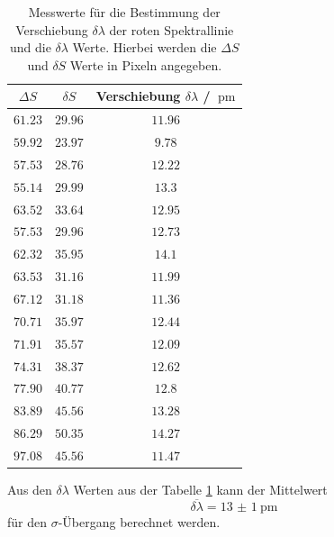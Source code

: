 \begin{table}
    \centering
    \caption{Messwerte für die Bestimmung der Verschiebung $\delta \lambda$ der roten Spektrallinie und die $\delta\lambda$ Werte. Hierbei werden die $\Delta S$ und $\delta S$ Werte in Pixeln angegeben.}
    \label{tab:rot_Verschiebung}
    \begin{tabular}{c c c}
        \toprule
        $\Delta S$&$\delta S$&Verschiebung $\delta \lambda$ / $\SI{}{\pico\meter}$\\
        \midrule 
        $\num{61.23}$&$\num{29.96}$&$\num{11.96}$\\
        $\num{59.92}$&$\num{23.97}$&$\num{9.78}$\\
        $\num{57.53}$&$\num{28.76}$&$\num{12.22}$\\
        $\num{55.14}$&$\num{29.99}$&$\num{13.3}$\\
        $\num{63.52}$&$\num{33.64}$&$\num{12.95}$\\
        $\num{57.53}$&$\num{29.96}$&$\num{12.73}$\\
        $\num{62.32}$&$\num{35.95}$&$\num{14.1}$\\
        $\num{63.53}$&$\num{31.16}$&$\num{11.99}$\\
        $\num{67.12}$&$\num{31.18}$&$\num{11.36}$\\
        $\num{70.71}$&$\num{35.97}$&$\num{12.44}$\\
        $\num{71.91}$&$\num{35.57}$&$\num{12.09}$\\
        $\num{74.31}$&$\num{38.37}$&$\num{12.62}$\\
        $\num{77.90}$&$\num{40.77}$&$\num{12.8}$\\
        $\num{83.89}$&$\num{45.56}$&$\num{13.28}$\\
        $\num{86.29}$&$\num{50.35}$&$\num{14.27}$\\
        $\num{97.08}$&$\num{45.56}$&$\num{11.47}$\\
        \bottomrule
    \end{tabular}
\end{table}
\FloatBarrier
Aus den $\delta\lambda$ Werten aus der Tabelle \ref{tab:rot_Verschiebung} kann der Mittelwert
\begin{equation*}
    \overline{\delta\lambda} = \SI{13(1)}{\pico\meter}
\end{equation*}
für den $\sigma$-Übergang berechnet werden.
